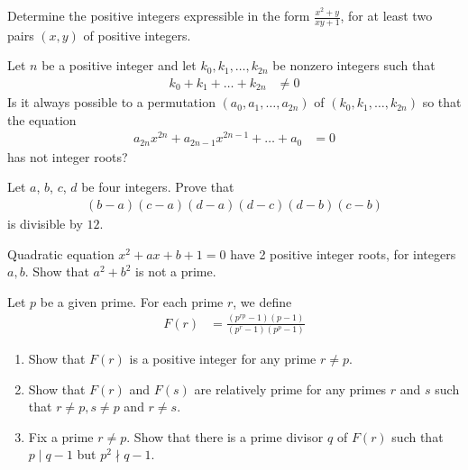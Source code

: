 \documentclass[problems.tex]{subfile}
\begin{document}
	\begin{problem}
		Determine the positive integers expressible in the form $\frac{x^2+y}{xy+1}$, for at least two pairs $(x,y)$ of positive integers. %
	\end{problem}

	\begin{problem}
		Let $n$ be a positive integer and let $k_0,k_1, \dots,k_{2n}$ be nonzero integers such that
			\begin{align*}
				k_0+k_1 +\dots+k_{2n}
					& \neq 0
			\end{align*}
		Is it always possible to a permutation $(a_0,a_1,\dots,a_{2n})$ of $(k_0,k_1,\dots,k_{2n})$ so that the equation
			\begin{align*}
				a_{2n}x^{2n}+a_{2n-1}x^{2n-1}+\dots+a_0
					& =0
			\end{align*}
		has not integer roots? %
	\end{problem}

	\begin{problem}
		Let $a$, $b$, $c$, $d$ be four integers. Prove that
			\begin{align*}
				\left(b-a\right)\left(c-a\right)\left(d-a\right)\left(d-c\right)\left(d-b\right)\left(c-b\right)
			\end{align*}
		is divisible by $12$. %
	\end{problem}

	\begin{problem}
		Quadratic equation $ x^2+ax+b+1=0$ have 2 positive integer roots, for integers $ a,b$. Show that $ a^2+b^2$ is not a prime. %
	\end{problem}

	\begin{problem}
		Let $p$ be a given prime. For each prime $r$, we define
		\begin{align*}
			F(r) &= \frac{(p^{rp} -1)(p-1)}{(p^r-1)(p^p-1)}
		\end{align*}
		\begin{enumerate}
			\item Show that $F(r)$ is a positive integer for any prime $r \neq p$.
			\item Show that $F(r)$ and $F(s)$ are relatively prime for any primes $r$ and $s$ such that $r \neq p, s\neq p$ and $r \neq s$.
			\item Fix a prime $r \neq p$. Show that there is a prime divisor $q$ of $F(r)$ such that $p \mid q - 1$ but $p^2 \nmid q - 1$.
		\end{enumerate}
	\end{problem}
\end{document}
